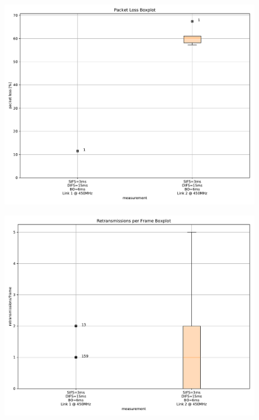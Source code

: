 \documentclass{article}
\begin{document}
\begin{figure}
	\includegraphics[width=\textwidth]{rb_dual/link_1_2/boxplot/packet_loss_boxplot}
\end{figure}

\begin{figure}
	\includegraphics[width=\textwidth]{rb_dual/link_1_2/boxplot/retransmissions_per_frame_boxplot}
\end{figure}
\end{document}
